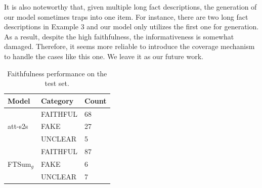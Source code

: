 \documentclass[letterpaper]{article} %
\begin{document}
	It is also noteworthy that, given multiple long fact descriptions, the generation of our model sometimes traps into one item.
	For instance, there are two long fact descriptions in Example 3 and our model only utilizes the first one for generation.
	As a result, despite the high faithfulness, the informativeness is somewhat damaged.
	Therefore, it seems more reliable to introduce the coverage mechanism~\cite{see2017get} to handle the cases like this one.
	We leave it as our future work.
	
	\begin{table}
		\centering
		\begin{tabular}{l|ll}
			\hline
			Model                    & Category    & Count \\ \hline
			\multirow{3}{*}{att-s2s} & FAITHFUL       & 68    \\
			& FAKE & 27    \\
			& UNCLEAR  & 5     \\ \hline
			\multirow{3}{*}{FTSum$_g$}   & FAITHFUL       & 87    \\
			& FAKE & 6     \\
			& UNCLEAR  & 7     \\ \hline
		\end{tabular}
		\caption{Faithfulness performance on the test set.}
		\label{tb:validation}
	\end{table}
	
\end{document}
